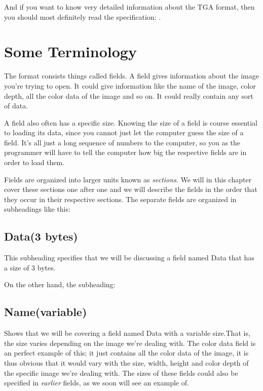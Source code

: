 \begin{refsection}
  And if you want to know very detailed information about the TGA
  format, then you should most definitely read the \tga specification:
  \cite{91:_truev_tga_file_format_specif}.

  \section{Some Terminology}

  The \tga format consists things called fields. A field
  gives information about the image you're trying to open. It could
  give information like the name of the image, color depth, all the
  color data of the image and so on. It could really contain any sort
  of data.

  A field also often has a specific size. Knowing the size of a field
  is course essential to loading its data, since you cannot just let
  the computer guess the size of a field. It's all just a long sequence
  of numbers to the computer, so you as the programmer will have to
  tell the computer how big the respective fields are in order to load
  them.

  \newcommand{\plural}[3]{\ifstrequal{#1}{1}{#2}{#3}}
  \newcommand{\fieldlength}[1]{\ifstrequal{#1}{0}{variable}{#1 \plural{#1}{byte}{bytes}}}
  \newcommand{\imgfield}[2]{\subsection*{#1(\fieldlength{#2})}}
  \newcommand{\imgsubfield}[2]{\subsubsection*{#1(\fieldlength{#2})}}

  Fields are organized into larger units known as
  \textit{sections}. We will in this chapter cover
  these sections one after one and we will describe the fields in the
  order that they occur in their respective sections. The separate
  fields are organized in subheadings like this:

  \imgfield{Data}{3}

  This subheading specifies that we will be discussing a field named
  Data that has a size of 3 bytes.

  On the other hand, the subheading:

  \imgfield{Name}{0}

  Shows that we will be covering a field named Data with a variable
  size.That is, the size varies depending on the image we're
  dealing with. The color data field is an perfect example of this; it
  just contains all the color data of the image, it is thus obvious
  that it would vary with the size, width, height and color depth of
  the specific image we're dealing with. The sizes of these fields
  could also be specified in \textit{earlier} fields, as we soon will see an
  example of.


\end{refsection}
